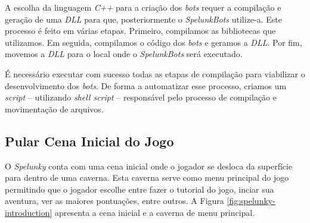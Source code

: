 A escolha da linguagem \textit{C++} para a criação dos \textit{bots} requer a
compilação e geração de uma \textit{DLL} para que, posteriormente o
\textit{SpelunkBots} utilize-a. Este processo é feito em várias etapas.
Primeiro, compilamos as bibliotecas que utilizamos. Em seguida, compilamos o
código dos \textit{bots} e geramos a \textit{DLL}. Por fim, movemos a
\textit{DLL} para o local onde o \textit{SpelunkBots} será executado.

É necessário executar com sucesso todas as etapas de compilação para viabilizar
o desenvolvimento dos \textit{bots}. De forma a automatizar esse processo,
criamos um \textit{script} -- utilizando \textit{shell script} -- responsável
pelo processo de compilação e movimentação de arquivos.

\subsection{Pular Cena Inicial do Jogo}

O \textit{Spelunky} conta com uma cena inicial onde o jogador se desloca da
superfície para dentro de uma caverna. Esta caverna serve como menu principal do
jogo permitindo que o jogador escolhe entre fazer o tutorial do jogo, inciar sua
aventura, ver as maiores pontuações, entre outros. A Figura
\ref{fig:spelunky-introduction} apresenta a cena inicial e a caverna de menu
principal.

